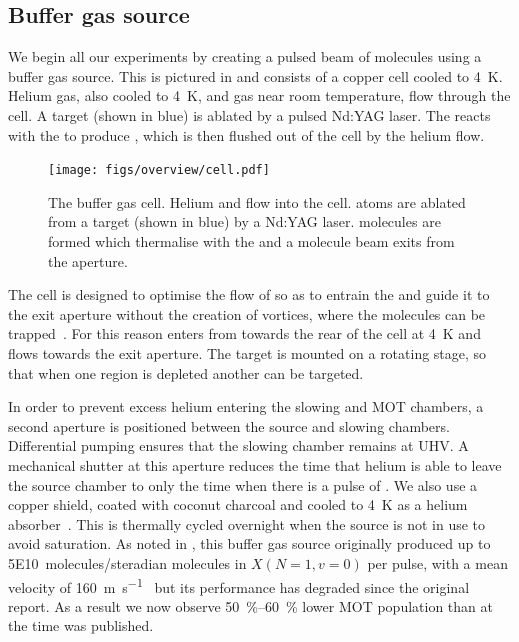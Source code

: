 \subsection{Buffer gas source}

We begin all our experiments by creating a pulsed beam of \CaF{} molecules
using a buffer gas source. This is pictured in 
and consists of a copper cell cooled to \SI{4}{\kelvin}. 
%
Helium gas, also cooled to \SI{4}{\kelvin}, and \SFsix{} gas near room
temperature, flow through the cell. A \Ca{} target (shown in blue) is ablated
by a pulsed Nd:YAG laser. The \Ca{} reacts with the \SFsix{} to produce \CaF{}, which is
then flushed out of the cell by the helium flow.

\begin{figure}
  \centering
  \texttt{[image: figs/overview/cell.pdf]}
  \caption[The buffer gas cell]{
    The buffer gas cell. Helium and \SFsix flow into the cell. \Ca{}
  atoms are ablated from a target (shown in blue) by a Nd:YAG laser. \CaF{} molecules are
formed which thermalise with the \He{} and a molecule beam exits from the aperture.}
  \label{overview:fig:source}
\end{figure}

The cell is designed to optimise the flow of \He{} so as to entrain the 
\CaF{} and guide it to the exit aperture without the creation of vortices,
where the molecules can be trapped~\cite{Truppe2018}. For this reason \He{}
enters from towards the rear of the cell at \SI{4}{\kelvin} and flows towards
the exit aperture.  The \Ca{} target is  mounted on a rotating stage, so that
when one region is depleted another can be targeted.

In order to prevent excess helium entering the slowing and MOT chambers, a
second aperture is positioned between the source and slowing chambers.
Differential pumping ensures that the slowing chamber remains at UHV. A
mechanical shutter at this aperture reduces the time that helium is able to
leave the source chamber to only the time when there is a pulse of \CaF{}. We
also use a copper shield, coated with coconut charcoal and cooled to
\SI{4}{\kelvin} as a helium absorber~\cite{doi:10.1116/1.574141}. This is
thermally cycled overnight when the source is not in use to avoid saturation.
As noted in , this buffer gas source originally
produced up to \SI{5E10}{molecules/steradian} molecules in $X(N=1, v=0)$ per
pulse, with a
mean velocity of \SI{160}{\meter\per\second}~\cite{Truppe2018} but its
performance has degraded since the original report. As a result we now observe
\SIrange{50}{60}{\percent} lower MOT population than at the time
 was published.

